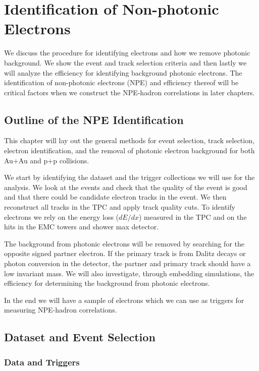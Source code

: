 \chapter{Identification of Non-photonic Electrons}

We discuss the procedure for identifying electrons and how we remove photonic background. We show the event and track selection criteria and then lastly we will analyze the efficiency for identifying background photonic electrons. The identification of non-photonic electrons (NPE) and efficiency thereof will be critical factors when we construct the NPE-hadron correlations in later chapters.

\section{Outline of the NPE Identification}

This chapter will lay out the general methods for event selection, track selection, electron identification, and the removal of photonic electron background for both Au+Au and p+p collisions.

We start by identifying the dataset and the trigger collections we will use for the analysis. We look at the events and check that the quality of the event is good and that there could be candidate electron tracks in the event. We then reconstruct all tracks in the TPC and apply track quality cuts. To identify electrons we rely on the energy loss ($dE/dx$) measured in the TPC and on the hits in the EMC towers and shower max detector. 

The background from photonic electrons will be removed by searching for the opposite signed partner electron. If the primary track is from Dalitz decays or photon conversion in the detector, the partner and primary track should have a low invariant mass. We will also investigate, through embedding simulations, the efficiency for determining the background from photonic electrons.

In the end we will have a sample of electrons which we can use as triggers for measuring NPE-hadron correlations. 

\section{Dataset and Event Selection}

\subsection{Data and Triggers}

